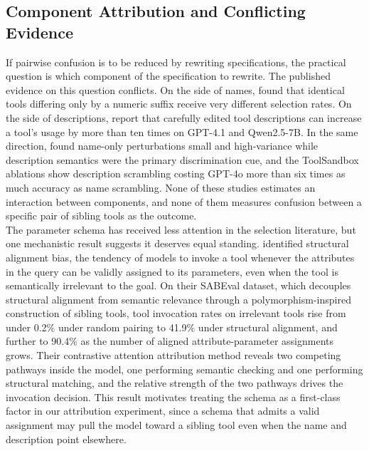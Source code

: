 \subsection{Component Attribution and Conflicting Evidence}

If pairwise confusion is to be reduced by rewriting specifications, the practical question is which component of the specification to rewrite.
The published evidence on this question conflicts.
On the side of names, \textcite{sneh2025tooltweak} found that identical tools differing only by a numeric suffix receive very different selection rates.
On the side of descriptions, \textcite{faghih2025gaming} report that carefully edited tool descriptions can increase a tool's usage by more than ten times on GPT-4.1 and Qwen2.5-7B.
In the same direction, \textcite{blankenstein2025biasbusters} found name-only perturbations small and high-variance while description semantics were the primary discrimination cue, and the ToolSandbox ablations \cite{lu2024toolsandbox} show description scrambling costing GPT-4o more than six times as much accuracy as name scrambling.
None of these studies estimates an interaction between components, and none of them measures confusion between a specific pair of sibling tools as the outcome.
\\

The parameter schema has received less attention in the selection literature, but one mechanistic result suggests it deserves equal standing.
\textcite{liu2026structural} identified structural alignment bias, the tendency of models to invoke a tool whenever the attributes in the query can be validly assigned to its parameters, even when the tool is semantically irrelevant to the goal.
On their SABEval dataset, which decouples structural alignment from semantic relevance through a polymorphism-inspired construction of sibling tools, tool invocation rates on irrelevant tools rise from under 0.2\% under random pairing to 41.9\% under structural alignment, and further to 90.4\% as the number of aligned attribute-parameter assignments grows.
Their contrastive attention attribution method reveals two competing pathways inside the model, one performing semantic checking and one performing structural matching, and the relative strength of the two pathways drives the invocation decision.
This result motivates treating the schema as a first-class factor in our attribution experiment, since a schema that admits a valid assignment may pull the model toward a sibling tool even when the name and description point elsewhere.
\\

